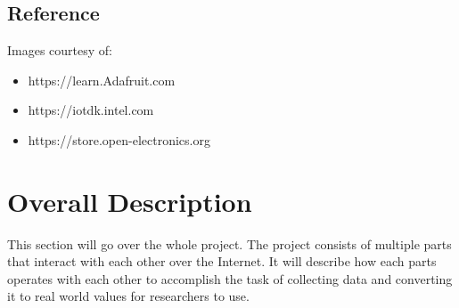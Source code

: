 \documentclass[onecolumn, draftclsnofoot,10pt, compsoc]{IEEEtran}
\begin{document}
\subsection{Reference}
Images courtesy of:
\begin{itemize}
\item https://learn.Adafruit.com
\item https://iotdk.intel.com
\item https://store.open-electronics.org
\end{itemize}

\section{Overall Description}
This section will go over the whole project.  The project consists of multiple parts that interact with each other over the Internet.  It will describe how each parts operates with each other to accomplish the task of collecting data and converting it to real world values for researchers to use.
\end{document}
